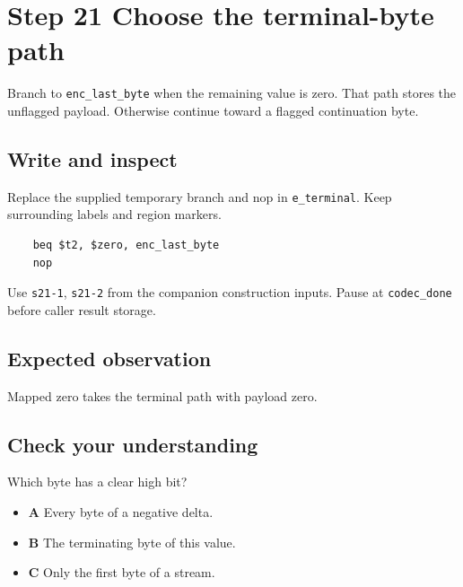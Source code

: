 \section{Step 21 Choose the terminal-byte path}\label{delta-s21}

Branch to \texttt{enc\_last\_byte} when the remaining value is zero. That path stores the unflagged payload. Otherwise continue toward a flagged continuation byte.

\subsection{Write and inspect}
Replace the supplied temporary branch and nop in \texttt{e\_terminal}. Keep surrounding labels and region markers.

\begin{verbatim}
    beq $t2, $zero, enc_last_byte
    nop
\end{verbatim}
Use \texttt{s21-1}, \texttt{s21-2} from the companion construction inputs. Pause at \texttt{codec\_done} before caller result storage.

\subsection{Expected observation}
Mapped zero takes the terminal path with payload zero.

\subsection{Check your understanding}
Which byte has a clear high bit?

\begin{itemize}
  \item \textbf{A} Every byte of a negative delta.
  \item \textbf{B} The terminating byte of this value.
  \item \textbf{C} Only the first byte of a stream.
\end{itemize}

